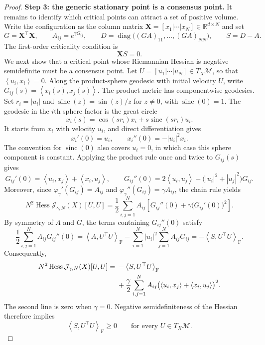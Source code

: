 \documentclass[11pt]{amsart}
\numberwithin{equation}{section}
\theoremstyle{plain}
\newcommand{\R}{\mathbb{R}}
\newcommand{\abs}[1]{\left\lvert#1\right\rvert}
\newcommand{\ip}[2]{\left\langle#1,#2\right\rangle}
\begin{document}
\begin{proof}
\par\medskip\noindent
\textbf{Step 3: the generic stationary point is a consensus point.}\quad
It remains to identify which critical points can attract a set of positive
volume.  Write the configuration as the column matrix
$\mathbf X=[x_1|\cdots|x_N]\in\R^{d\times N}$ and set
\[
 G=\mathbf X^\top\mathbf X,
 \qquad A_{ij}=e^{\gamma G_{ij}},
 \qquad D=\operatorname{diag}\bigl((GA)_{11},\ldots,(GA)_{NN}\bigr),
 \qquad S=D-A.
\]
The first-order criticality condition is
\begin{equation}\label{eq:spherical-critical-matrix}
 \mathbf X S=0.
\end{equation}
We next show that a critical point whose Riemannian Hessian is negative
semidefinite must be a consensus point.  Let
$U=[u_1|\cdots|u_N]\in T_X\mathcal M$, so that $\ip{u_i}{x_i}=0$.  Along
the product-sphere geodesic with initial velocity $U$, write
$G_{ij}(s)=\ip{x_i(s)}{x_j(s)}$.
The product metric has componentwise geodesics.  Set
$r_i=\abs{u_i}$ and
$\operatorname{sinc}(z)=\sin(z)/z$ for $z\neq0$, with
$\operatorname{sinc}(0)=1$.  The geodesic in the $i$th sphere factor is the
great circle
\[
 x_i(s)=\cos(sr_i)x_i+s\operatorname{sinc}(sr_i)u_i.
\]
It starts from $x_i$ with velocity $u_i$, and direct differentiation gives
\[
 x_i'(0)=u_i,
 \qquad x_i''(0)=-\abs{u_i}^2x_i.
\]
The convention for $\operatorname{sinc}(0)$ also covers $u_i=0$, in which
case this sphere component is constant.  Applying the product rule once and
twice to $G_{ij}(s)$ gives
\[
 G_{ij}'(0)=\ip{u_i}{x_j}+\ip{x_i}{u_j},
 \qquad
 G_{ij}''(0)=2\ip{u_i}{u_j}
 -\bigl(\abs{u_i}^2+\abs{u_j}^2\bigr)G_{ij}.
\]
Moreover, since
$\varphi_\gamma'(G_{ij})=A_{ij}$ and
$\varphi_\gamma''(G_{ij})=\gamma A_{ij}$, the chain rule yields
\[
 N^2\operatorname{Hess}\mathcal J_{\gamma,N}(X)[U,U]
 =\frac12\sum_{i,j=1}^N A_{ij}
 \left[G_{ij}''(0)+\gamma\bigl(G_{ij}'(0)\bigr)^2\right].
\]
By symmetry of $A$ and $G$, the terms containing $G_{ij}''(0)$ satisfy
\[
 \frac12\sum_{i,j=1}^N A_{ij}G_{ij}''(0)
 =\left\langle A,U^\top U\right\rangle_{\mathrm F}
  -\sum_{i=1}^N\abs{u_i}^2\sum_{j=1}^NA_{ij}G_{ij}
 =-\left\langle S,U^\top U\right\rangle_{\mathrm F}.
\]
Consequently,
\begin{align}
 N^2\operatorname{Hess}\mathcal J_{\gamma,N}(X)[U,U]
 ={}&-\left\langle S,U^\top U\right\rangle_{\mathrm F}\notag\\
 &+\frac{\gamma}{2}\sum_{i,j=1}^N A_{ij}
 \bigl(\ip{u_i}{x_j}+\ip{x_i}{u_j}\bigr)^2.
 \label{eq:spherical-hessian-form}
\end{align}
The second line is zero when $\gamma=0$.  Negative semidefiniteness of the
Hessian therefore implies
\begin{equation}\label{eq:spherical-S-positive}
 \left\langle S,U^\top U\right\rangle_{\mathrm F}\geq0
 \qquad\text{for every }U\in T_X\mathcal M.
\end{equation}


\end{proof}
\end{document}
